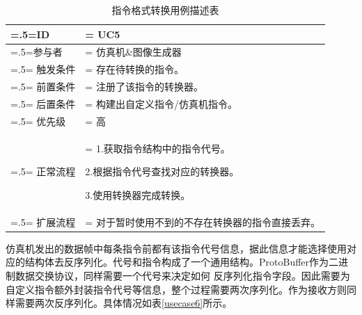 \begin{table}[htbp]
    \begin{center}
        \caption{指令格式转换用例描述表}
        \label{usecase5}
        \renewcommand\arraystretch{1.5}
        \begin{tabularx}{0.8\textwidth}{ 
            | >{\centering\arraybackslash\hsize=.5\hsize\linewidth=\hsize}X 
            | >{\raggedright\arraybackslash\hsize=1.5\hsize\linewidth=\hsize}X 
            | }
            \hline
            \textbf{ID} & \textbf{UC5}\\
            \hline
            参与者 & 仿真机\&图像生成器\\
            \hline
            触发条件 & 存在待转换的指令。\\
            \hline
            前置条件 & 注册了该指令的转换器。\\
            \hline
            后置条件 & 构建出自定义指令/仿真机指令。\\
            \hline
            优先级 & 高\\
            \hline
            正常流程 &  1.获取指令结构中的指令代号。\par 2.根据指令代号查找对应的转换器。\par 3.使用转换器完成转换。\\
            \hline
            扩展流程 & 对于暂时使用不到的不存在转换器的指令直接丢弃。\\
            \hline
        \end{tabularx}
    \end{center}
\end{table}
\par
仿真机发出的数据帧中每条指令前都有该指令代号信息，据此信息才能选择使用对应的结构体去反序列化。代号和指令构成了一个通用结构。ProtoBuffer作为二进制数据交换协议，同样需要一个代号来决定如何
反序列化指令字段。因此需要为自定义指令额外封装指令代号等信息，整个过程需要两次序列化。作为接收方则同样需要两次反序列化。具体情况如表\ref{usecase6}所示。
